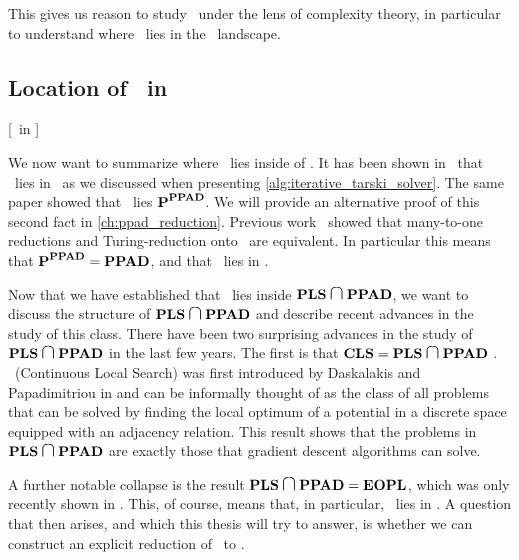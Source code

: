 This gives us reason to study \Tarski\ under the lens of complexity theory, in particular to understand where \Tarski\ lies in the \TFNP\ landscape.

\subsection{Location of \Tarski\ in \TFNP}[\Tarski\ in \TFNP]

We now want to summarize where \Tarski\ lies inside of \TFNP. It has been shown in~\cite{etessami_tarskis_2020} that \Tarski\ lies in \PLS\ as we discussed when presenting \cref{alg:iterative_tarski_solver}. The same paper showed that \Tarski\ lies $\textbf{P}^{\textbf{PPAD}}$. We will provide an alternative proof of this second fact in \cref{ch:ppad_reduction}. Previous work~ showed that many-to-one reductions and Turing-reduction onto \PPAD\ are equivalent. In particular this means that $\textbf{P}^{\textbf{PPAD}} = \textbf{PPAD}$, and that \Tarski\ lies in \PPAD{}.

Now that we have established that \Tarski\ lies inside $\PLS \medcap \PPAD$, we want to discuss the structure of $\PLS \medcap \PPAD$ and describe recent advances in the study of this class. There have been two surprising advances in the study of $\PLS \medcap \PPAD$ in the last few years. The first is that $\CLS = \PLS \medcap \PPAD$ . \CLS\ (Continuous Local Search) was first introduced by Daskalakis and Papadimitriou in  and can be informally thought of as the class of all problems that can be solved by finding the local optimum of a potential in a discrete space equipped with an adjacency relation. This result shows that the problems in $\PLS \medcap \PPAD$ are exactly those that gradient descent algorithms can solve.

A further notable collapse is the result $\PLS \medcap \PPAD = \EOPL$, which was only recently shown in . This, of course, means that, in particular, \Tarski\ lies in \EOPL. A question that then arises, and which this thesis will try to answer, is whether we can construct an explicit reduction of \Tarski\ to \EndOfPotentialLine.
